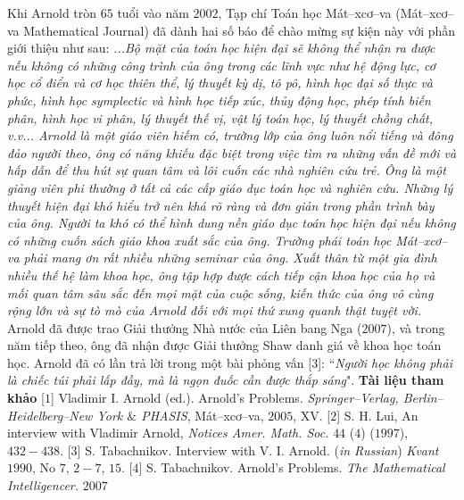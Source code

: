\begin{multicols}{2}
\begin{figure}[H]
	\end{figure}
	Khi Arnold tròn $65$ tuổi vào năm $2002$, Tạp chí Toán học Mát--xcơ--va (Mát--xcơ--va Mathematical Journal) đã dành hai số báo để chào mừng sự kiện này với phần giới thiệu như sau: 
	\vskip 0.1cm
	\textit{...Bộ mặt của toán học hiện đại sẽ không thể nhận ra được nếu không có những công trình của ông trong các lĩnh vực như hệ động lực, cơ học cổ điển và cơ học thiên thể, lý thuyết  kỳ dị, tô pô, hình học đại số thực và phức, hình học symplectic và hình học tiếp xúc, thủy động học, phép tính biến phân, hình học vi phân, lý thuyết thế vị, vật lý toán học, lý thuyết chồng chất, v.v...
	\vskip 0.1cm
	Arnold là một giáo viên hiếm có, trường lớp của ông luôn nổi tiếng và đông đảo người theo, ông có năng khiếu đặc biệt trong việc tìm ra những vấn đề mới và  hấp dẫn để thu hút sự quan tâm và lôi cuốn các nhà nghiên cứu trẻ. Ông là một giảng viên phi thường ở tất cả các cấp giáo dục toán học và nghiên cứu. Những lý thuyết hiện đại khó hiểu trở nên khá rõ ràng và đơn giản trong phần trình bày của ông. Người ta khó có thể hình dung nền giáo dục toán học hiện đại nếu không có những cuốn sách giáo khoa xuất sắc của ông. Trường phái toán học Mát--xcơ--va phải mang ơn rất nhiều những seminar của ông.
	\vskip 0.1cm
	Xuất thân từ một gia đình nhiều thế hệ làm khoa học, ông tập hợp được cách tiếp cận khoa học của họ và mối quan tâm sâu sắc đến mọi mặt của cuộc sống, kiến thức của ông vô cùng rộng lớn và sự tò mò của Arnold đối với mọi thứ xung quanh thật tuyệt vời.}
	\vskip 0.1cm
	Arnold đã được trao Giải thưởng Nhà nước của Liên bang Nga ($2007$), và trong năm tiếp theo, ông đã nhận được Giải thưởng Shaw danh giá về khoa học toán học.
	\vskip 0.1cm
	Arnold đã có lần trả lời trong một bài phỏng vấn [$3$]: ``\textit{Người học không phải là chiếc túi phải lấp đầy, mà là ngọn đuốc cần được thắp sáng}".
	\vskip 0.1cm
	\textbf{\color{quantoan}Tài liệu tham khảo}
	\vskip 0.1cm
	[$1$] Vladimir I. Arnold (ed.). Arnold's Problems. \textit{Springer--Verlag, Berlin--Heidelberg--New York $\&$ PHASIS}, Mát--xcơ--va, $2005$, XV.
	\vskip 0.1cm
	[$2$]	S. H. Lui, An interview with Vladimir Arnold, \textit{Notices Amer. Math. Soc.} $44$ ($4$) ($1997$), $432-438$.
	\vskip 0.1cm
	[$3$]	S. Tabachnikov. Interview with V. I. Arnold. (\textit{in Russian}) \textit{Kvant} $1990$, No $7$, $2-7$, $15$.
	\vskip 0.1cm
	[$4$]	S. Tabachnikov. Arnold's Problems. \textit{The Mathematical Intelligencer.} $2007$
\end{multicols}